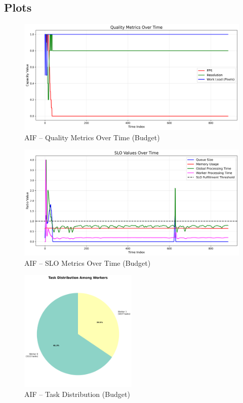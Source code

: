 \subsection*{Plots}
\begin{figure}[h]
    \centering
    \includegraphics[width=\textwidth]{img/results/variable_computational_budget_sim/active_inference_relative_control_quality_metrics.png}
    \caption{AIF – Quality Metrics Over Time (Budget)}
\end{figure}
\begin{figure}[h]
    \centering
    \includegraphics[width=\textwidth]{img/results/variable_computational_budget_sim/active_inference_relative_control_slo_values.png}
    \caption{AIF – SLO Metrics Over Time (Budget)}
\end{figure}
\begin{figure}[h]
    \centering
    \includegraphics[width=0.5\textwidth]{img/results/variable_computational_budget_sim/active_inference_relative_control_task_distribution_pie.png}
    \caption{AIF – Task Distribution (Budget)}
\end{figure}
